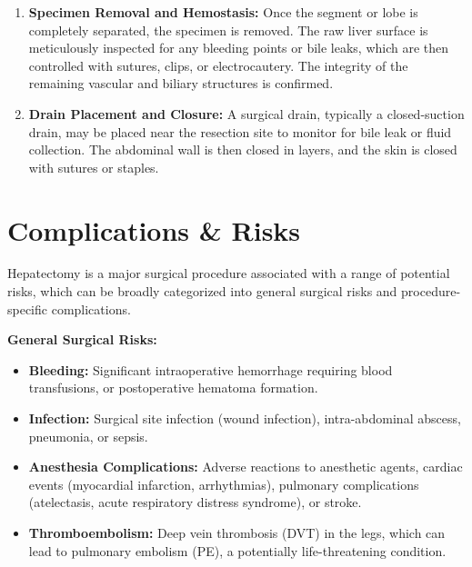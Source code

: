 \begin{enumerate}
  \item \textbf{Specimen Removal and Hemostasis:} Once the segment or lobe is completely separated, the specimen is removed. The raw liver surface is meticulously inspected for any bleeding points or bile leaks, which are then controlled with sutures, clips, or electrocautery. The integrity of the remaining vascular and biliary structures is confirmed.
  \item \textbf{Drain Placement and Closure:} A surgical drain, typically a closed-suction drain, may be placed near the resection site to monitor for bile leak or fluid collection. The abdominal wall is then closed in layers, and the skin is closed with sutures or staples.
\end{enumerate}

\section*{Complications \& Risks}
Hepatectomy is a major surgical procedure associated with a range of potential risks, which can be broadly categorized into general surgical risks and procedure-specific complications.

\textbf{General Surgical Risks:}
\begin{itemize}
  \item \textbf{Bleeding:} Significant intraoperative hemorrhage requiring blood transfusions, or postoperative hematoma formation.
  \item \textbf{Infection:} Surgical site infection (wound infection), intra-abdominal abscess, pneumonia, or sepsis.
  \item \textbf{Anesthesia Complications:} Adverse reactions to anesthetic agents, cardiac events (myocardial infarction, arrhythmias), pulmonary complications (atelectasis, acute respiratory distress syndrome), or stroke.
  \item \textbf{Thromboembolism:} Deep vein thrombosis (DVT) in the legs, which can lead to pulmonary embolism (PE), a potentially life-threatening condition.
\end{itemize}

